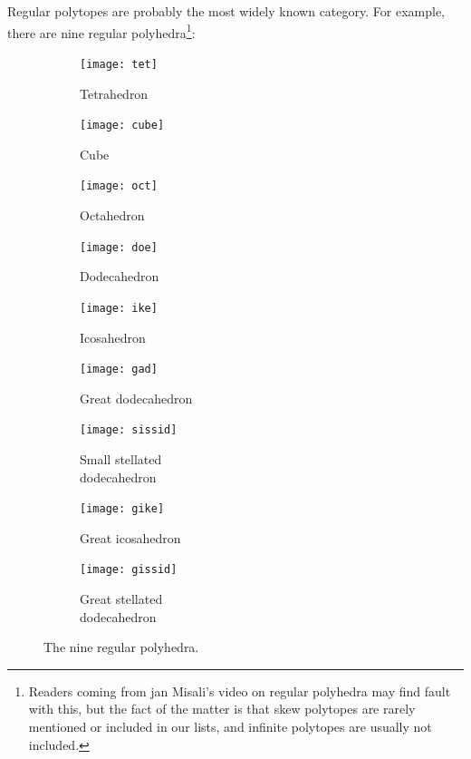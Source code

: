 \documentclass{article}
\begin{document}
Regular polytopes are probably the most widely known category. For example, there are nine
regular polyhedra\footnote{
Readers coming from jan Misali's video on regular polyhedra may find fault with this,
but the fact of the matter is that skew polytopes are rarely mentioned or included in our lists,
and infinite polytopes are usually not included.
}:
\begin{figure}[H]
  \centering
  \begin{subfigure}{.2\textwidth}
    \centering
    \texttt{[image: tet]}
    \caption{Tetrahedron}
    \label{fig:r3_tet}
  \end{subfigure}%
  \begin{subfigure}{.2\textwidth}
    \centering
    \texttt{[image: cube]}
    \caption{Cube}
    \label{fig:r3_cube}
  \end{subfigure}%
  \begin{subfigure}{.2\textwidth}
    \centering
    \texttt{[image: oct]}
    \caption{Octahedron}
    \label{fig:r3_oct}
  \end{subfigure}%
  \begin{subfigure}{.2\textwidth}
    \centering
    \texttt{[image: doe]}
    \caption{Dodecahedron}
    \label{fig:r3_doe}
  \end{subfigure}%
  \begin{subfigure}{.2\textwidth}
    \centering
    \texttt{[image: ike]}
    \caption{Icosahedron}
    \label{fig:r3_ike}
  \end{subfigure}%
  
  \begin{subfigure}{.25\textwidth}
    \centering
    \texttt{[image: gad]}
    \caption{Great dodecahedron}
    \label{fig:r3_gad}
  \end{subfigure}%
  \begin{subfigure}{.25\textwidth}
    \centering
    \texttt{[image: sissid]}
    \caption{Small stellated\\dodecahedron}
    \label{fig:r3_sissid}
  \end{subfigure}%
  \begin{subfigure}{.25\textwidth}
    \centering
    \texttt{[image: gike]}
    \caption{Great icosahedron}
    \label{fig:r3_gike}
  \end{subfigure}%
  \begin{subfigure}{.25\textwidth}
    \centering
    \texttt{[image: gissid]}
    \caption{Great stellated\\dodecahedron}
    \label{fig:r3_gissid}
  \end{subfigure}%
  \caption{The nine regular polyhedra.}
  \label{fig:regulars3D}
\end{figure}
\end{document}
